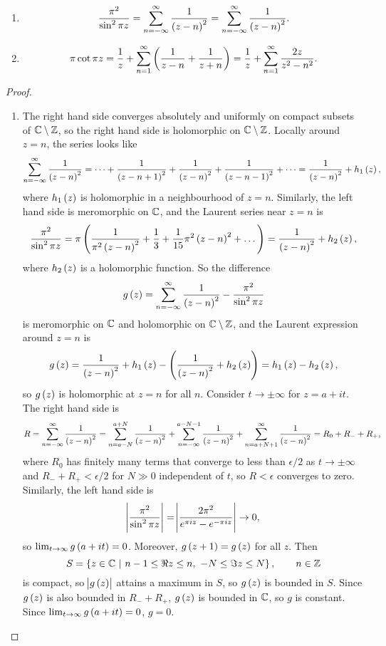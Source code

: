 \begin{lemma}
\hfill
\begin{enumerate}
\item
$$ \dfrac{\pi^2}{\sin^2 \pi z} =  \sum_{n = -\infty}^\infty \dfrac{1}{\br{z - n}^2} = \sum_{n = -\infty}^\infty \dfrac{1}{\br{z - n}^2}. $$
\item
$$ \pi\cot \pi z = \dfrac{1}{z} + \sum_{n = 1}^\infty \br{\dfrac{1}{z - n} + \dfrac{1}{z + n}} = \dfrac{1}{z} + \sum_{n = 1}^\infty \dfrac{2z}{z^2 - n^2}. $$
\end{enumerate}
\end{lemma}

\begin{proof}
\hfill
\begin{enumerate}
\item The right hand side converges absolutely and uniformly on compact subsets of $ \mathbb{C} \setminus \mathbb{Z} $, so the right hand side is holomorphic on $ \mathbb{C} \setminus \mathbb{Z} $. Locally around $ z = n $, the series looks like
$$ \sum_{n = -\infty}^\infty \dfrac{1}{\br{z - n}^2} = \dots + \dfrac{1}{\br{z - n + 1}^2} + \dfrac{1}{\br{z - n}^2} + \dfrac{1}{\br{z - n - 1}^2} + \dots = \dfrac{1}{\br{z - n}^2} + h_1\br{z}, $$
where $ h_1\br{z} $ is holomorphic in a neighbourhood of $ z = n $. Similarly, the left hand side is meromorphic on $ \mathbb{C} $, and the Laurent series near $ z = n $ is
$$ \dfrac{\pi^2}{\sin^2 \pi z} = \pi\br{\dfrac{1}{\pi^2\br{z - n}^2} + \dfrac{1}{3} + \dfrac{1}{15}\pi^2\br{z - n}^2 + \dots} = \dfrac{1}{\br{z - n}^2} + h_2\br{z}, $$
where $ h_2\br{z} $ is a holomorphic function. So the difference
$$ g\br{z} = \sum_{n = -\infty}^\infty \dfrac{1}{\br{z - n}^2} - \dfrac{\pi^2}{\sin^2 \pi z} $$
is meromorphic on $ \mathbb{C} $ and holomorphic on $ \mathbb{C} \setminus \mathbb{Z} $, and the Laurent expression around $ z = n $ is
$$ g\br{z} = \dfrac{1}{\br{z - n}^2} + h_1\br{z} - \br{\dfrac{1}{\br{z - n}^2} + h_2\br{z}} = h_1\br{z} - h_2\br{z}, $$
so $ g\br{z} $ is holomorphic at $ z = n $ for all $ n $. Consider $ t \to \pm\infty $ for $ z = a + it $. The right hand side is
$$ R = \sum_{n = -\infty}^\infty \dfrac{1}{\br{z - n}^2} = \sum_{n = a - N}^{a + N} \dfrac{1}{\br{z - n}^2} + \sum_{n = -\infty}^{a - N - 1} \dfrac{1}{\br{z - n}^2} + \sum_{n = a + N + 1}^\infty \dfrac{1}{\br{z - n}^2} = R_0 + R_- + R_+, $$
where $ R_0 $ has finitely many terms that converge to less than $ \epsilon / 2 $ as $ t \to \pm\infty $ and $ R_- + R_+ < \epsilon / 2 $ for $ N \gg 0 $ independent of $ t $, so $ R < \epsilon $ converges to zero. Similarly, the left hand side is
$$ \abs{\dfrac{\pi^2}{\sin^2 \pi z}} = \abs{\dfrac{2\pi^2}{e^{\pi iz} - e^{-\pi iz}}} \to 0, $$
so $ \lim_{t \to \infty} g\br{a + it} = 0 $. Moreover, $ g\br{z + 1} = g\br{z} $ for all $ z $. Then
$$ S = \cbr{z \in \CC \st n - 1 \le \Re z \le n, \ -N \le \Im z \le N}, \qquad n \in \ZZ $$
is compact, so $ \abs{g\br{z}} $ attains a maximum in $ S $, so $ g\br{z} $ is bounded in $ S $. Since $ g\br{z} $ is also bounded in $ R_- + R_+ $, $ g\br{z} $ is bounded in $ \mathbb{C} $, so $ g $ is constant. Since $ \lim_{t \to \infty} g\br{a + it} = 0 $, $ g = 0 $.


\end{enumerate}
\end{proof}
